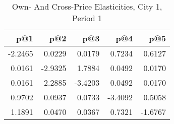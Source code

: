 \begin{table}[H]
    \centering
    \caption{Own- And Cross-Price Elasticities, City 1, Period 1}
    \label{tab:q9_elasticities_city1_period1}
\begin{tabular}{rrrrr}
\toprule
p@1 & p@2 & p@3 & p@4 & p@5 \\
\midrule
\midrule
-2.2465 & 0.0229 & 0.0179 & 0.7234 & 0.6127 \\
0.0161 & -2.9325 & 1.7884 & 0.0492 & 0.0170 \\
0.0161 & 2.2885 & -3.4203 & 0.0492 & 0.0170 \\
0.9702 & 0.0937 & 0.0733 & -3.4092 & 0.5058 \\
1.1891 & 0.0470 & 0.0367 & 0.7321 & -1.6767 \\
\bottomrule
\bottomrule
\end{tabular}

\end{table}
